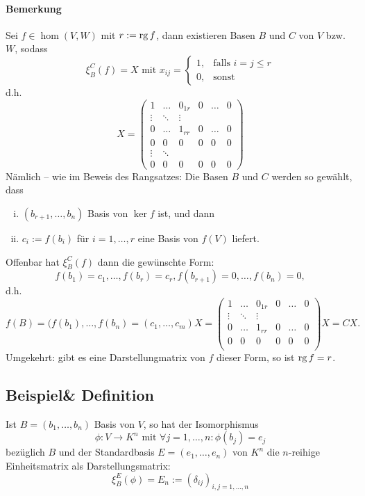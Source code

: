 \paragraph{Bemerkung}
	Sei $ f\in \hom(V,W) $ mit $ r:= \operatorname{rg} f $, dann existieren Basen $ B $ und $ C $ von $ V $ bzw. $ W $, sodass
		\[ \xi_B^C(f) = X \text{ mit } x_{ij} =
			\begin{cases}
			1,& \text{falls }i=j\leq r\\
			0,& \text{sonst}
			\end{cases} \]
	d.h.
		\[ X = \left(\begin{array}{ccc|ccc}
		1 & \dots & 0_{1r} & 0 &\dots & 0\\
		\vdots &\ddots & \vdots &&&\\
		0 & \dots & 1_{rr} & 0 &\dots & 0\\\hline
		0 & 0 & 0 & 0 & 0 & 0\\
		\vdots & \ddots &&&&\\
		0 & 0 & 0 & 0 & 0 & 0
		\end{array}\right) \]
	Nämlich -- wie im Beweis des Rangsatzes: Die Basen $ B $ und $ C $ werden so gewählt, dass
		 \begin{enumerate}[(i)]
		 	\item $ (b_{r+1},\dots,b_n) $ Basis von $ \ker f $ ist, und dann
		 	\item $ c_i := f(b_i) $ für $ i= 1,\dots,r $ eine Basis von $ f(V) $ liefert.
		 \end{enumerate}
	Offenbar hat $ \xi_B^C(f)$ dann die gewünschte Form:
		\[ f(b_1)=c_1,\dots,f(b_r)=c_r,f(b_{r+1})=0,\dots,f(b_n)=0, \]
	d.h.
		\[ f(B) = (f(b_1),\dots,f(b_n)=(c_1,\dots,c_m)X = \begin{pmatrix}
				1 & \dots & 0_{1r} & 0 &\dots & 0\\
				\vdots &\ddots & \vdots &&&\\
				0 & \dots & 1_{rr} & 0 &\dots & 0\\
				0 & 0 & 0 & 0 & 0 & 0\\
				\end{pmatrix}X = CX. \]
	Umgekehrt: gibt es eine Darstellungmatrix von $ f $ dieser Form, so ist $ \operatorname{rg} f = r $.
\subsection{Beispiel\& Definition}
	\begin{Definition}[Einheitsmatrix]
	Ist $ B=(b_1,\dots,b_n) $ Basis von $ V $, so hat der Isomorphismus
		\[ \phi:V\to K^n \text{ mit } \forall j=1,\dots,n:\phi(b_j)=e_j \]
	bezüglich $ B $ und der Standardbasis $ E = (e_1,\dots,e_n) $ von $ K^n $ die $ n $-reihige Einheitsmatrix als Darstellungsmatrix:
		\[ \xi_B^E(\phi) = E_n := (\delta_{ij})_{i,j = 1,\dots,n} \]
	\end{Definition}
